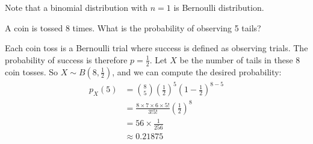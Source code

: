 Note that a binomial distribution with \( n = 1 \) is Bernoulli distribution.

\begin{exmp}
    A coin is tossed 8 times. What is the probability of observing 5 tails?
\end{exmp}
\begin{solution}
    Each coin toss is a Bernoulli trial where success is defined as observing trials.
    The probability of success is therefore \( p = \frac{1}{2} \).
    Let \( X \) be the number of tails in these 8 coin tosses.
    So \( X \sim B(8, \frac{1}{2}) \), and we can compute the desired probability:
    \begin{align*}
        p_{X}(5) &= \binom{8}{5} (\frac{1}{2})^5 (1 - \frac{1}{2})^{8 - 5}\\
        &= \frac{8 \times 7 \times 6 \times 5!}{3!5!} (\frac{1}{2})^8\\
        &= 56 \times \frac{1}{256}\\
        &\approx 0.21875
    \end{align*}
\end{solution}

